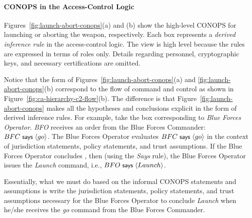 
\paragraph*{CONOPS in the Access-Control Logic }


Figures~\ref{fig:launch-abort-conops}(a) and (b) show the high-level
CONOPS for launching or aborting the weapon, respectively. Each box
represents a \emph{derived inference rule} in the access-control
logic. The view is high level because the rules are expressed in terms
of roles only. Details regarding personnel, cryptographic keys, and
necessary certifications are omitted.

Notice that the form of Figures~\ref{fig:launch-abort-conops}(a) and
\ref{fig:launch-abort-conops}(b) correspond to the flow of command and
control as shown in Figure~\ref{fig:ca-hierarchy-c2-flow}(b). The
difference is that Figure~\ref{fig:launch-abort-conops} makes all the
hypotheses and conclusions explicit in the form of derived inference
rules. For example, take the box corresponding to \emph{Blue Forces
  Operator}.  \emph{BFO} receives an order from the Blue Forces
Commander: $BFC \text{\small\textsf{ says }} \langle go \rangle$. The Blue Forces Operator evaluates
$BFC \text{\small\textsf{ says }} \langle go \rangle$ in the context of jurisdiction statements,
policy statements, and trust assumptions.  If the Blue Forces Operator
concludes , then (using the \emph{Says} rule), the Blue
Forces Operator issues the \emph{Launch} command, i.e., $BFO \text{\small\textsf{ says }}
\langle Launch \rangle$.

Essentially, what we must do based on the informal CONOPS statements
and assumptions is write the jurisdiction statements, policy
statements, and trust assumptions necessary for the Blue Forces
Operator to conclude \emph{Launch} when he/she receives the \emph{go}
command from the Blue Forces Commander. 


